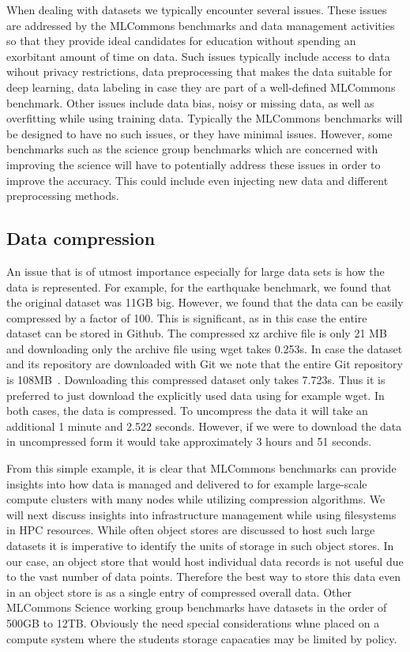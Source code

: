 \documentclass[utf8]{FrontiersinVancouver} %
\begin{document}
{When dealing with datasets we typically encounter several issues.
These issues are addressed by the MLCommons benchmarks and data
management activities so that they provide ideal candidates for
education without spending an exorbitant amount of time on data. Such
issues typically include access to data wihout privacy restrictions,
data preprocessing that makes the data suitable for deep learning,
data labeling in case they are part of a well-defined MLCommons
benchmark. Other issues include data bias, noisy or missing data, as
well as overfitting while using training data. Typically the MLCommons
benchmarks will be designed to have no such issues, or they have
minimal issues. However, some benchmarks such as the science group
benchmarks which are concerned with improving the science will have to
potentially address these issues in order to improve the
accuracy. This could include even injecting new data and different
preprocessing methods.


\subsection{Data compression}

An issue that is of utmost importance especially for large data sets
is how the data is represented. For example, for the earthquake
benchmark, we found that the original dataset was 11GB big. However,
we found that the data can be easily compressed by a factor of
100. This is significant, as in this case the entire dataset can be
stored in Github. The compressed xz archive file is only 21 MB and
downloading only the archive file using wget takes 0.253s. In case the
dataset and its repository are downloaded with Git we note that the
entire Git repository is
108MB~\citep{mlcommons-earthquake-data}. Downloading this compressed
dataset only takes 7.723s. Thus it is preferred to just download the
explicitly used data using for example wget. In both cases, the data
is compressed. To uncompress the data it will take an additional 1
minute and 2.522 seconds. However, if we were to download the data in
uncompressed form it would take approximately 3 hours and 51 seconds.

From this simple example, it is clear that MLCommons benchmarks can
provide insights into how data is managed and delivered to for example
large-scale compute clusters with many nodes while utilizing
compression algorithms. We will next discuss insights into
infrastructure management while using filesystems in HPC resources.
While often object stores are discussed to host such large datasets it
is imperative to identify the units of storage in such object stores.
In our case, an object store that would host individual data records
is not useful due to the vast number of data points. Therefore the
best way to store this data even in an object store is as a single
entry of compressed overall data.  Other MLCommons Science working
group benchmarks have datasets in the order of 500GB to
12TB. Obviously the need special considerations whne placed on a
compute system where the students storage capacaties may be limited by
policy.


}
\end{document}
